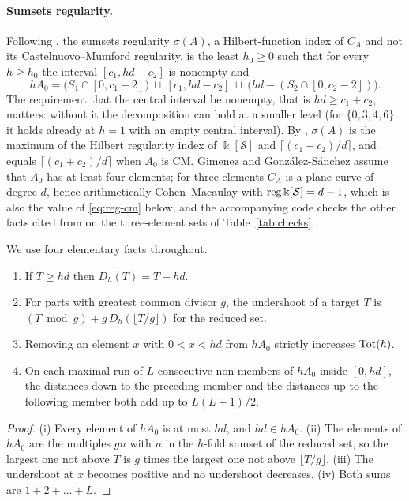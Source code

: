 \paragraph{Sumsets regularity.} Following \cite[Def.~1.3]{GimenezGonzalezSanchez2023}, the sumsets regularity $\sigma(A)$, a Hilbert-function index of $C_A$ and not its Castelnuovo--Mumford regularity, is the least $h_0\ge0$ such that for every $h\ge h_0$ the interval $[c_1,hd-c_2]$ is nonempty and
\[
hA_0=\bigl(S_1\cap[0,c_1-2]\bigr)\ \sqcup\ [c_1,hd-c_2]\ \sqcup\ \bigl(hd-(S_2\cap[0,c_2-2])\bigr).
\]
The requirement that the central interval be nonempty, that is $hd\ge c_1+c_2$, matters: without it the decomposition can hold at a smaller level (for $\{0,3,4,6\}$ it holds already at $h=1$ with an empty central interval). By \cite[Thm.~3.1, Prop.~3.2]{GimenezGonzalezSanchez2023}, $\sigma(A)$ is the maximum of the Hilbert regularity index of $\Bbbk[\mathcal S]$ and $\lceil(c_1+c_2)/d\rceil$, and equals $\lceil(c_1+c_2)/d\rceil$ when $A_0$ is CM. Gimenez and Gonz\'alez-S\'anchez assume that $A_0$ has at least four elements; for three elements $C_A$ is a plane curve of degree $d$, hence arithmetically Cohen--Macaulay with $\operatorname{reg}\Bbbk[\mathcal S]=d-1$, which is also the value of \eqref{eq:reg-cm} below, and the accompanying code checks the other facts cited from \cite{GimenezGonzalezSanchez2023} on the three-element sets of Table~\ref{tab:checks}.

We use four elementary facts throughout.

\begin{lemma}\label{lem:elementary}
\begin{enumerate}
\item[(i)] If $T\ge hd$ then $D_h(T)=T-hd$.
\item[(ii)] For parts with greatest common divisor $g$, the undershoot of a target $T$ is $(T\bmod g)+g\,D_h(\lfloor T/g\rfloor)$ for the reduced set.
\item[(iii)] Removing an element $x$ with $0<x<hd$ from $hA_0$ strictly increases $\operatorname{Tot}(h)$.
\item[(iv)] On each maximal run of $L$ consecutive non-members of $hA_0$ inside $[0,hd]$, the distances down to the preceding member and the distances up to the following member both add up to $L(L+1)/2$.
\end{enumerate}
\end{lemma}

\begin{proof}
(i) Every element of $hA_0$ is at most $hd$, and $hd\in hA_0$. (ii) The elements of $hA_0$ are the multiples $gn$ with $n$ in the $h$-fold sumset of the reduced set, so the largest one not above $T$ is $g$ times the largest one not above $\lfloor T/g\rfloor$. (iii) The undershoot at $x$ becomes positive and no undershoot decreases. (iv) Both sums are $1+2+\dots+L$.
\end{proof}
